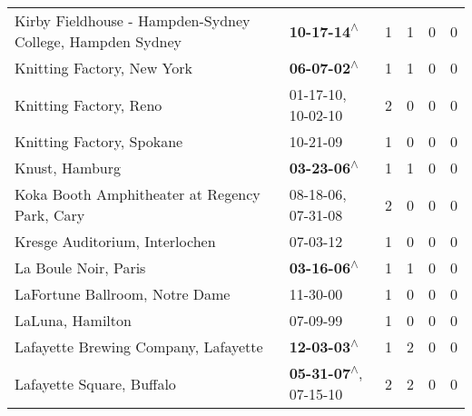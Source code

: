 \begin{supertabular}{p{0.4\textwidth}p{0.3\textwidth}p{0.05\textwidth}p{0.05\textwidth}p{0.05\textwidth}p{0.05\textwidth}}
                    Kirby Fieldhouse - Hampden-Sydney College, Hampden Sydney &                                                 \textbf{10-17-14\textsuperscript{$\wedge$}} &  1 &  1 &  0 &  0 \\
                                                   Knitting Factory, New York &                                                 \textbf{06-07-02\textsuperscript{$\wedge$}} &  1 &  1 &  0 &  0 \\
                                                       Knitting Factory, Reno &                                      01-17-10\textsuperscript{}, 10-02-10\textsuperscript{} &  2 &  0 &  0 &  0 \\
                                                    Knitting Factory, Spokane &                                                                  10-21-09\textsuperscript{} &  1 &  0 &  0 &  0 \\
                                                               Knust, Hamburg &                                                 \textbf{03-23-06\textsuperscript{$\wedge$}} &  1 &  1 &  0 &  0 \\
                                Koka Booth Amphitheater at Regency Park, Cary &                                      08-18-06\textsuperscript{}, 07-31-08\textsuperscript{} &  2 &  0 &  0 &  0 \\
                                               Kresge Auditorium, Interlochen &                                                                  07-03-12\textsuperscript{} &  1 &  0 &  0 &  0 \\
                                                         La Boule Noir, Paris &                                                 \textbf{03-16-06\textsuperscript{$\wedge$}} &  1 &  1 &  0 &  0 \\
                                               LaFortune Ballroom, Notre Dame &                                                                  11-30-00\textsuperscript{} &  1 &  0 &  0 &  0 \\
                                                             LaLuna, Hamilton &                                                                  07-09-99\textsuperscript{} &  1 &  0 &  0 &  0 \\
                                         Lafayette Brewing Company, Lafayette &                                                 \textbf{12-03-03\textsuperscript{$\wedge$}} &  1 &  2 &  0 &  0 \\
                                                    Lafayette Square, Buffalo &                     \textbf{05-31-07\textsuperscript{$\wedge$}}, 07-15-10\textsuperscript{} &  2 &  2 &  0 &  0 \\

\end{supertabular}
